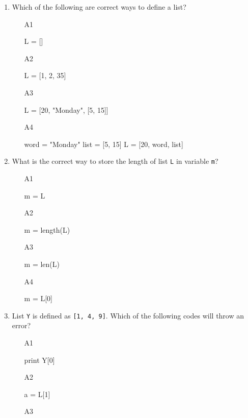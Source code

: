 \begin{enumerate}
\item Which of the following are correct ways to define a list?
\begin{enumerate}
\item[A1] 
\begin{bluecode}
L = []
\end{bluecode}
\item[A2] 
\begin{bluecode}
L = [1, 2, 35]
\end{bluecode}
\item[A3] 
\begin{bluecode}
L = [20, "Monday", [5, 15]]
\end{bluecode}
\item[A4] 
\begin{bluecode}
word = "Monday"
list = [5, 15]
L = [20, word, list]
\end{bluecode}
\end{enumerate}
\item What is the correct way to store the length of list {\tt L}
in variable {\tt m}?
\begin{enumerate}
\item[A1] 
\begin{bluecode}
m = L
\end{bluecode}
\item[A2] 
\begin{bluecode}
m = length(L)
\end{bluecode}
\item[A3] 
\begin{bluecode}
m = len(L)
\end{bluecode}
\item[A4] 
\begin{bluecode}
m = L[0]
\end{bluecode}
\end{enumerate}
\item List {\tt Y} is defined as {\tt [1, 4, 9]}. Which of the 
following codes will throw an error?
\begin{enumerate}
\item[A1] 
\begin{bluecode}
print Y[0]
\end{bluecode}
\item[A2] 
\begin{bluecode}
a = L[1]
\end{bluecode}
\item[A3] 
\begin{bluecode}

\end{bluecode}
\end{enumerate}
\end{enumerate}
